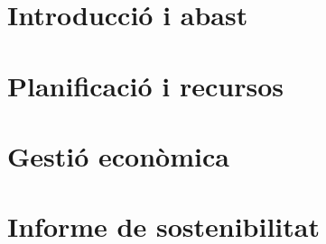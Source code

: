 \documentclass[a4paper,12pt]{report}
\begin{document}
	\tableofcontents
	\chapter{Introducció i abast}
	
	\chapter{Planificació i recursos}
	
%	
%	
%	
%	
	\chapter{Gestió econòmica}
	
	\chapter{Informe de sostenibilitat}
	
%	

	\printbibliography[heading=bibintoc]
	\cleardoublepage{}
	\listoftables
	\cleardoublepage{}
	\listoffigures
\end{document}
